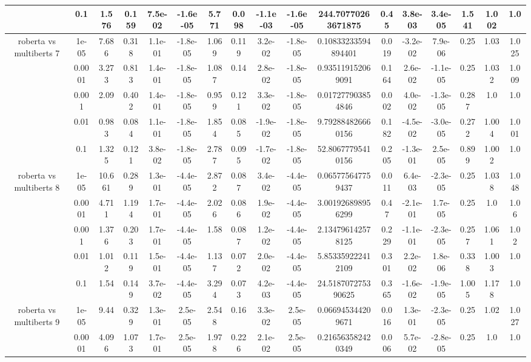 \begin{tabular}{|c|c|c|c|c|c|c|c|c|c|c|c|c|c|c|c|c|}
 & 0.1 & 1.576 & 0.159 & 7.5e-02 & -1.6e-05 & 5.771 & 0.098 & -1.1e-03 & -1.6e-05 & 244.70770263671875 & 0.45 & 3.8e-03 & 3.4e-05 & 1.541 & 1.002 & 1.0 \\
\hline
\multirow{5}{*}{roberta  vs multiberts 7} & 1e-05 & 7.686 & 0.318 & 1.1e-01 & -1.8e-05 & 1.069 & 0.119 & 3.2e-02 & -1.8e-05 & 0.10833233594894401 & 0.019 & -3.2e-02 & 7.9e-06 & 0.25 & 1.03 & 1.025 \\
 & 0.0001 & 3.273 & 0.813 & 1.4e-01 & -1.8e-05 & 1.087 & 0.14 & 2.8e-02 & -1.8e-05 & 0.935119152069091 & 0.164 & 2.6e-02 & -1.1e-05 & 0.25 & 1.032 & 1.009 \\
 & 0.001 & 2.09 & 0.402 & 1.4e-01 & -1.8e-05 & 0.959 & 0.121 & 3.3e-02 & -1.8e-05 & 0.017277903854846 & 0.002 & 4.0e-02 & -1.3e-05 & 0.287 & 1.0 & 1.0 \\
 & 0.01 & 0.983 & 0.084 & 1.1e-01 & -1.8e-05 & 1.854 & 0.085 & -1.9e-02 & -1.8e-05 & 9.792884826660156 & 0.182 & -4.5e-02 & -3.0e-05 & 0.272 & 1.004 & 1.001 \\
 & 0.1 & 1.325 & 0.121 & 3.8e-02 & -1.8e-05 & 2.787 & 0.095 & -1.7e-02 & -1.8e-05 & 52.80677795410156 & 0.205 & -1.3e-01 & 2.5e-05 & 0.899 & 1.002 & 1.0 \\
\hline
\multirow{5}{*}{roberta  vs multiberts 8} & 1e-05 & 10.661 & 0.289 & 1.3e-01 & -4.4e-05 & 2.872 & 0.087 & 3.4e-02 & -4.4e-05 & 0.065775647759437 & 0.011 & 6.4e-03 & -2.3e-05 & 0.25 & 1.038 & 1.048 \\
 & 0.0001 & 4.711 & 1.194 & 1.7e-01 & -4.4e-05 & 2.026 & 0.086 & 1.9e-02 & -4.4e-05 & 3.001926898956299 & 0.47 & -2.1e-01 & 1.7e-05 & 0.25 & 1.0 & 1.06 \\
 & 0.001 & 1.376 & 0.203 & 1.7e-01 & -4.4e-05 & 1.58 & 0.087 & 1.2e-02 & -4.4e-05 & 2.134796142578125 & 0.229 & -1.1e-01 & -2.3e-05 & 0.257 & 1.061 & 1.02 \\
 & 0.01 & 1.012 & 0.119 & 1.5e-01 & -4.4e-05 & 1.137 & 0.072 & 2.0e-02 & -4.4e-05 & 5.853359222412109 & 0.301 & 2.2e-02 & 1.8e-06 & 0.338 & 1.003 & 1.0 \\
 & 0.1 & 1.54 & 0.149 & 3.7e-02 & -4.4e-05 & 3.294 & 0.073 & 4.2e-03 & -4.4e-05 & 24.518707275390625 & 0.365 & -1.6e-02 & -1.9e-05 & 1.005 & 1.178 & 1.0 \\
\hline
\multirow{5}{*}{roberta  vs multiberts 9} & 1e-05 & 9.44 & 0.329 & 1.3e-01 & 2.5e-05 & 2.548 & 0.16 & 3.3e-02 & 2.5e-05 & 0.066945344209671 & 0.016 & 1.3e-01 & -2.3e-05 & 0.25 & 1.02 & 1.027 \\
 & 0.0001 & 4.096 & 1.073 & 1.7e-01 & 2.5e-05 & 1.978 & 0.226 & 2.1e-02 & 2.5e-05 & 0.216563582420349 & 0.006 & 5.7e-02 & -2.8e-05 & 0.25 & 1.0 & 1.0 \\

\end{tabular}
